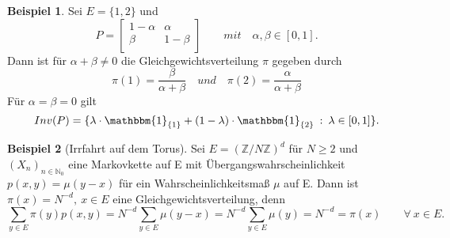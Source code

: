 \documentclass[a4paper,12pt]{scrartcl}
\theoremstyle{definition}
\newtheorem{bsp}{Beispiel}[section]
\begin{document}
\begin{bsp}
Sei $E = \lbrace 1,2 \rbrace$ und 
\begin{equation*}
P=
\begin{bmatrix}
 1- \alpha & \alpha \\
 \beta & 1-\beta \\
\end{bmatrix}
\qquad mit \quad \alpha , \beta \in [0,1].
\end{equation*}
Dann ist für $\alpha + \beta \neq 0$ die Gleichgewichtsverteilung $\pi$ gegeben durch
\begin{equation*}
\pi(1) = \dfrac{\beta}{\alpha + \beta } \quad und \quad \pi(2) = \dfrac{\alpha}{\alpha + \beta }
\end{equation*}
Für $\alpha = \beta = 0$ gilt
\begin{equation*}
Inv(P) = \lbrace \lambda \cdot \mathbbm{1}_{\lbrace 1 \rbrace} + (1-\lambda) \cdot \mathbbm{1}_{\lbrace 2 \rbrace} \: : \: \lambda \in [0,1] \rbrace.
\end{equation*}
\end{bsp}
\begin{bsp}[Irrfahrt auf dem Torus]
Sei $E = (\mathbb{Z}/N \mathbb{Z})^{d}$ für $N \geq 2$ und $(X_{n})_{n \in \mathbb{N}_{0}}$ eine Markovkette auf E mit Übergangswahrscheinlichkeit $p(x,y) = \mu (y-x)$ für ein Wahrscheinlichkeitsmaß $\mu$ auf E. Dann ist $\pi(x) = N^{-d}, \: x \in E$ eine Gleichgewichtsverteilung, denn
\begin{equation*}
\sum_{y \in E} \pi(y)p(x,y) = N^{-d} \sum_{y \in E} \mu (y-x) = N^{-d} \sum_{y \in E} \mu (y) =  N^{-d} = \pi (x) \qquad \forall \: x \in E.
\end{equation*}
\end{bsp}
\clearpairofpagestyles
\ihead{\headmark}
\ohead{\pagemark}
\pagestyle{scrheadings}
\end{document}
